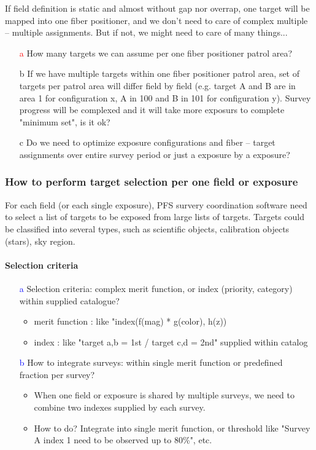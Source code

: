 \documentclass[a4paper,notitlepage]{article}
\newcommand{\cols}[1]{\textcolor{red}{#1}}
\newcommand{\coll}[1]{\textcolor{blue}{#1}}
\begin{document}
If field definition is static and almost without gap nor overrap, 
one target will be mapped into one fiber positioner, and we don't need to 
care of complex multiple -- multiple assignments. 
But if not, we might need to care of many things... 

\begin{enumerate}
  \item[\cols{a}] How many targets we can assume per one fiber positioner patrol 
    area?
  \item[b] If we have multiple targets within one fiber positioner patrol 
    area, set of targets per patrol area will differ field by field 
    (e.g. target A and B are in area 1 for configuration x, 
    A in 100 and B in 101 for configuration y). 
    Survey progress will be complexed and it will take more exposurs to 
    complete "minimum set", is it ok?
  \item[c] Do we need to optimize exposure configurations and fiber -- target 
    assignments over entire survey period or just a exposure by a exposure? 
\end{enumerate}


\subsubsection{How to perform target selection per one field or exposure}

For each field (or each single exposure), PFS survery coordination software 
need to select a list of targets to be exposed from large lists of targets. 
Targets could be classified into several types, such as scientific objects, 
calibration objects (stars), sky region. 

\paragraph{Selection criteria}

\begin{enumerate}
  \item[\coll{a}] Selection criteria: complex merit function, or index (priority, 
    category) within supplied catalogue?
    \begin{itemize}
      \item merit function : like "index(f(mag) * g(color), h(z))
      \item index : like "target a,b = 1st / target c,d = 2nd" supplied within 
        catalog
    \end{itemize}
  \item[\coll{b}] How to integrate surveys: within single merit function or predefined 
    fraction per survey?
    \begin{itemize}
      \item When one field or exposure is shared by multiple surveys, we need 
        to combine two indexes supplied by each survey.
      \item How to do? Integrate into single merit function, or threshold like 
        "Survey A index 1 need to be observed up to 80\%", etc.
    \end{itemize}
\end{enumerate}
\end{document}
